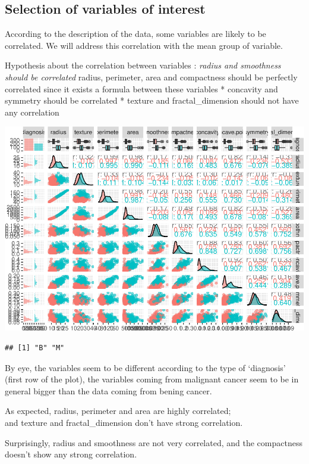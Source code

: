 \documentclass[
  11pt,
]{article}
\begin{document}
\hypertarget{selection-of-variables-of-interest}{%
\subsection{Selection of variables of
interest}\label{selection-of-variables-of-interest}}

According to the description of the data, some variables are likely to
be correlated. We will address this correlation with the mean group of
variable.

Hypothesis about the correlation between variables : \emph{radius and
smoothness should be correlated }radius, perimeter, area and compactness
should be perfectly correlated since it exists a formula between these
variables * concavity and symmetry should be correlated * texture and
fractal\_dimension should not have any correlation

\includegraphics{stat_DAP_files/figure-latex/unnamed-chunk-6-1.pdf}

\begin{verbatim}
## [1] "B" "M"
\end{verbatim}

By eye, the variables seem to be different according to the type of
`diagnosis' (first row of the plot), the variables coming from malignant
cancer seem to be in general bigger than the data coming from bening
cancer.

As expected, radius, perimeter and area are highly correlated;\\
and texture and fractal\_dimension don't have strong correlation.

Surprisingly, radius and smoothness are not very correlated, and the
compactness doesn't show any strong correlation.
\end{document}

